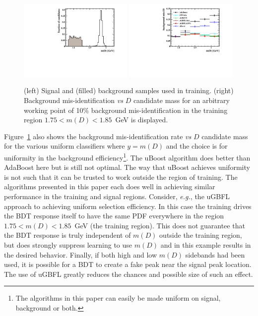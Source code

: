 \begin{figure}[] 
  \centering 
  \includegraphics[width=0.49\textwidth]{graphs2/mD_train.pdf}
  \includegraphics[width=0.49\textwidth]{graphs2/MD_eff.pdf}
  \caption{\label{fig:md_results} (left) Signal and (filled) background samples used in training.  (right) Background mis-identification {\em vs} $D$ candidate mass for an arbitrary working point of 10\% background mis-identification in the training region $1.75 < m(D) < 1.85$~GeV is displayed.}
\end{figure}

Figure~\ref{fig:md_results} also shows the background mis-identification rate {\em vs} $D$ candidate mass for the various uniform classifiers where $y = m(D)$ and the choice is for uniformity in the background efficiency\footnote{The algorithms in this paper can easily be made uniform on signal, background or both.}.  
The uBoost algorithm does better than AdaBoost here but is still not optimal.  The way that uBoost achieves uniformity is not such that it can be trusted to work outside the region of training.  The algorithms presented in this paper each does well in achieving similar performance in the training and signal regions.  
Consider, {\em e.g.}, the uGBFL approach to achieving uniform selection efficiency.  In this case the training drives the BDT response itself to have the same PDF everywhere in the region $1.75 < m(D) < 1.85$~GeV (the training region).  
This does not guarantee that the BDT response is truly independent of $m(D)$ outside the training region, but does strongly suppress learning to use $m(D)$ and in this example results in the desired behavior.  
Finally, if both high and low $m(D)$ sidebands had been used, it is possible for a BDT to create a fake peak near the signal peak location.  The use of uGBFL greatly reduces the chances and possible size of such an effect.



